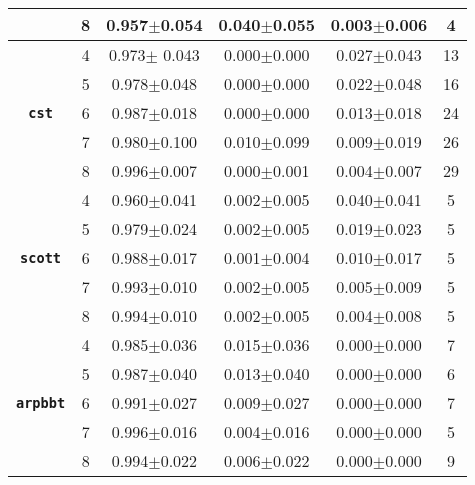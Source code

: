 \begin{table}[!ht]
\begin{tabular}{cccccc}
     & 8 & 0.957$\pm$0.054&	0.040$\pm$0.055&	0.003$\pm$0.006&	4\\
     \midrule
      & 4 & 0.973$\pm$	0.043&	0.000$\pm$0.000&	0.027$\pm$0.043&	13\\
     & 5 & 0.978$\pm$0.048&	0.000$\pm$0.000&	0.022$\pm$0.048&	16\\
     \textbf{\texttt{cst}}& 6 & 0.987$\pm$0.018&	0.000$\pm$0.000&	0.013$\pm$0.018&	24\\
     & 7 & 0.980$\pm$0.100&	0.010$\pm$0.099&	0.009$\pm$0.019&	26\\
     & 8 & 0.996$\pm$0.007&	0.000$\pm$0.001&	0.004$\pm$0.007&	29\\
     \midrule
      & 4 & 0.960$\pm$0.041&	0.002$\pm$0.005&	0.040$\pm$0.041&	5\\
     & 5 & 0.979$\pm$0.024&	0.002$\pm$0.005&	0.019$\pm$0.023&	5\\
     \textbf{\texttt{scott}}& 6 & 0.988$\pm$0.017&	0.001$\pm$0.004&	0.010$\pm$0.017&	5\\
     & 7 & 0.993$\pm$0.010&	0.002$\pm$0.005&	0.005$\pm$0.009&	5\\
     & 8 & 0.994$\pm$0.010&	0.002$\pm$0.005&	0.004$\pm$0.008&	5\\
     \midrule
      & 4 & 0.985$\pm$0.036&	0.015$\pm$0.036&	0.000$\pm$0.000&	7 \\
     & 5 & 0.987$\pm$0.040&	0.013$\pm$0.040&	0.000$\pm$0.000&	6\\
     \textbf{\texttt{arpbbt}}& 6 & 0.991$\pm$0.027&	0.009$\pm$0.027&	0.000$\pm$0.000&	7\\
     & 7 & 0.996$\pm$0.016&	0.004$\pm$0.016&	0.000$\pm$0.000&	5\\
     & 8 & 0.994$\pm$0.022&	0.006$\pm$0.022&	0.000$\pm$0.000&	9\\
    \bottomrule
  \end{tabular}
\end{table}

